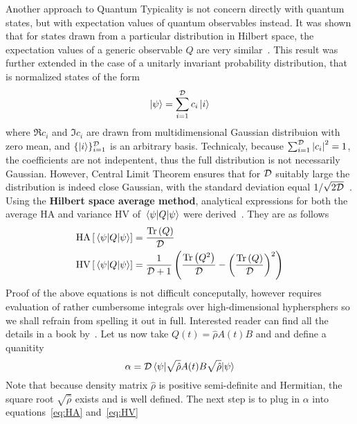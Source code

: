 Another approach to Quantum Typicality is not concern directly with quantum states, but with 
expectation values of quantum observables instead.
It was shown that for states drawn from a particular distribution in Hilbert space, the expectation
values of a generic observable \(Q\) are very similar~\autocite{Reimann2007}. This result was further extended
in the case of a unitarly invariant probability distribution, that is normalized states of the form
\begin{equation}
	\ket{\psi} = \sum_{i = 1}^{\mathcal{D}} c_i \ket{i}
\end{equation} 
where \(\Re c_i\) and \(\Im c_i\) are drawn from multidimensional Gaussian distribuion with zero mean,
and \(\{\ket{i}\}_{i=1}^{\mathcal{D}}\) is an arbitrary basis. Technicaly, because \(\sum_{i=1}^{\mathcal{D}}\abs{c_i}^2 = 1\),
the coefficients are not indepentent, thus the full distribution is not necessarily Gaussian. However,
Central Limit Theorem ensures that for \(\mathcal{D}\) suitably large the distribution is indeed close Gaussian,
with the standard deviation equal \(1/\sqrt{2\mathcal{D}}\)~\autocite{Gemmer2009}.
Using the \textbf{Hilbert space average method}, analytical expressions
for both the average \(\mathrm{HA}\) and variance \(\mathrm{HV}\) of \(\matrixel{\psi}{Q}{\psi}\)
were derived~\autocite{Bartsch2009a}. They are as follows
\begin{align}
	\mathrm{HA}\left[\matrixel{\psi}{Q}{\psi}\right] &= \frac{\Tr\left(Q\right)}{\dimension} \label{eq:HA} \\
	\mathrm{HV}\left[\matrixel{\psi}{Q}{\psi}\right] &= \frac{1}{\dimension + 1}\left(
		\frac{\Tr\left(Q^2\right)}{\dimension} - \left(\frac{\Tr\left(Q\right)}{\dimension}\right)^2
	\right)\label{eq:HV}
\end{align}
Proof of the above equations is not difficult conceputally, however requires evaluation of rather
cumbersome integrals over high-dimensional hyphersphers so we shall refrain from spelling it out in full.
Interested reader can find all the details in a book by~\textcite{Gemmer2009}.
Let us now take \(Q(t) = \hat{\rho}A(t)B\)
and and define a quanitity
\begin{equation}
	\alpha = \dimension \matrixel{\psi}{\sqrt{\hat{\rho}}A(t)B\sqrt{\hat{\rho}}}{\psi}
\end{equation}
Note that because density matrix \(\hat{\rho}\) is positive semi-definite and Hermitian, the
square root \(\sqrt{\hat{\rho}}\) exists and is well defined. The next step is to plug in \(\alpha\)
into equations~\eqref{eq:HA} and~\eqref{eq:HV}

